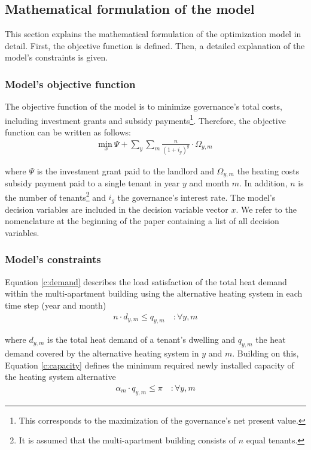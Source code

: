 \subsection{Mathematical formulation of the model}\label{met:formulas}
This section explains the mathematical formulation of the optimization model in detail. First, the objective function is defined. Then, a detailed explanation of the model's constraints is given. 

\subsubsection{Model's objective function}
The objective function of the model is to minimize governance's total costs, including investment grants and subsidy payments\footnote{This corresponds to the maximization of the governance's net present value.}. Therefore, the objective function can be written as follows: 
\begin{align}\label{objective}
\underset{x}{\mathrm{min~}} \Psi + \sum_{y} \sum_{m} \frac{n}{(1+i_g)^y} \cdot \Omega_{y,m}
\end{align}

where $\Psi$ is the investment grant paid to the landlord and $\Omega_{y,m}$ the heating costs subsidy payment paid to a single tenant in year $y$ and month $m$. In addition, $n$ is the number of tenants\footnote{It is assumed that the multi-apartment building consists of $n$ equal tenants.} and $i_g$ the governance's interest rate. The model's decision variables are included in the decision variable vector $x$. We refer to the nomenclature at the beginning of the paper containing a list of all decision variables.

\subsubsection{Model's constraints}
Equation \ref{c:demand} describes the load satisfaction of the total heat demand within the multi-apartment building using the alternative heating system in each time step (year and month) 
\begin{align}\label{c:demand}
n \cdot d_{y,m} \leq q_{y,m} \quad :\forall y,m
\end{align}

where $d_{y,m}$ is the total heat demand of a tenant's dwelling and $q_{y,m}$ the heat demand covered by the alternative heating system in $y$ and $m$. Building on this, Equation \ref{c:capacity} defines the minimum required newly installed capacity of the heating system alternative
\begin{align}\label{c:capacity}
\alpha_{m} \cdot q_{y,m} \leq \pi \quad :\forall y,m
\end{align}

